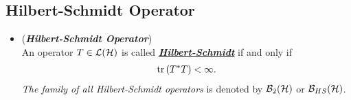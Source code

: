 \documentclass[11pt]{article}
\begin{document}
\subsection{Hilbert-Schmidt Operator}
\begin{itemize}
\item \begin{definition} (\emph{\textbf{Hilbert-Schmidt Operator}}) \\
An operator $T \in {\mathcal L}({\mathcal H})$ is called  \underline{\textbf{\emph{Hilbert-Schmidt}}} if and only if
\begin{align*}
\mathrm{tr}\left(T^{*}T \right) < \infty.
\end{align*}
\emph{The family of all Hilbert-Schmidt operators} is denoted by ${\mathcal B}_2({\mathcal H})$ or ${\mathcal B}_{HS}({\mathcal H})$.
\end{definition}


\end{itemize}
\end{document}
